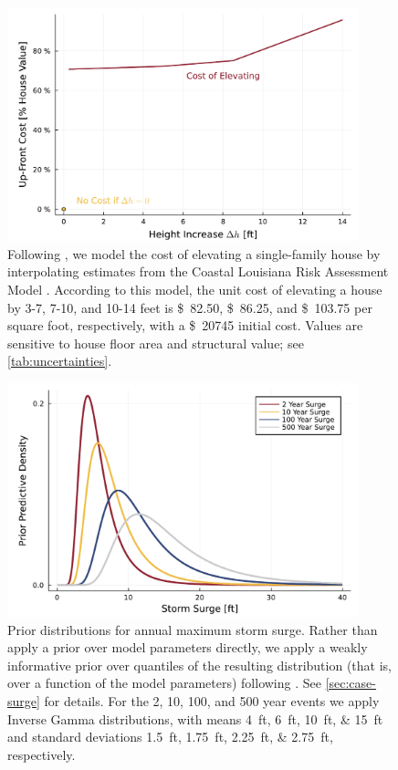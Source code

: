 \documentclass[11pt]{article}
\newcommand{\usd}[1]{\SI{#1}[\$]{}}
\begin{document}
\begin{figure}
    \centering
    \includegraphics[width=4in]{cost-up-front}
    \caption{
        Following \citet{zarekarizi_suboptimal:2020}, we model the cost of elevating a single-family house by interpolating estimates from the Coastal Louisiana Risk Assessment Model \citep{johnson_clara:2013}.
        According to this model, the unit cost of elevating a house by 3-7, 7-10, and 10-14 feet is \usd{82.50}, \usd{86.25}, and \usd{103.75} per square foot, respectively, with a \usd{20745} initial cost.
        Values are sensitive to house floor area and structural value; see \cref{tab:uncertainties}.
    }\label{fig:cost-up-front}
\end{figure}

\begin{figure}
    \centering
    \includegraphics[width=4in]{surge-gev-priors}
    \caption{
        Prior distributions for annual maximum storm surge.
        Rather than apply a prior over model parameters directly, we apply a weakly informative prior over quantiles of the resulting distribution (that is, over a function of the model parameters) following \citet{coles_evd:1996}.
        See \cref{sec:case-surge} for details.
        For the 2, 10, 100, and 500 year events we apply Inverse Gamma distributions, with means \SIlist{4;6;10;15}{ft} and standard deviations \SIlist{1.5;1.75;2.25;2.75}{ft}, respectively.
    }\label{fig:surge-gev-priors}
\end{figure}
\end{document}
